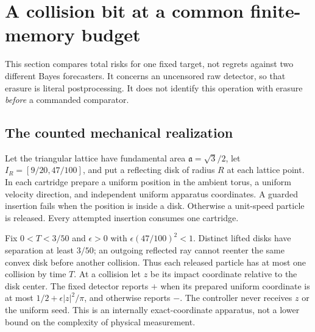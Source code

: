 \section{A collision bit at a common finite-memory budget}\label{sec:common-risk}
This section compares total risks for one fixed target, not regrets against
two different Bayes forecasters. It concerns an uncensored raw detector,
so that erasure is literal postprocessing. It does not identify this operation
with erasure \emph{before} a commanded comparator.

\subsection{The counted mechanical realization}
Let the triangular lattice have fundamental area
$\mathfrak a=\sqrt3/2$, let $I_R=[9/20,47/100]$, and put a reflecting
disk of radius $R$ at each lattice point. In each cartridge prepare a
uniform position in the ambient torus, a uniform velocity direction,
and independent uniform apparatus coordinates. A guarded insertion fails
when the position is inside a disk. Otherwise a unit-speed particle is
released. Every attempted insertion consumes one cartridge.

Fix $0<T<3/50$ and $\epsilon>0$ with
$\epsilon(47/100)^2<1$. Distinct lifted disks have separation at least
$3/50$; an outgoing reflected ray cannot reenter the same convex disk
before another collision. Thus each released particle has at most one
collision by time $T$. At a collision let $z$ be its impact coordinate
relative to the disk center. The fixed detector reports $+$ when its
prepared uniform coordinate is at most
$1/2+\epsilon|z|^2/\pi$, and otherwise reports $-$. The controller
never receives $z$ or the uniform seed. This is an internally exact-coordinate
apparatus, not a lower bound on the complexity of physical measurement.

